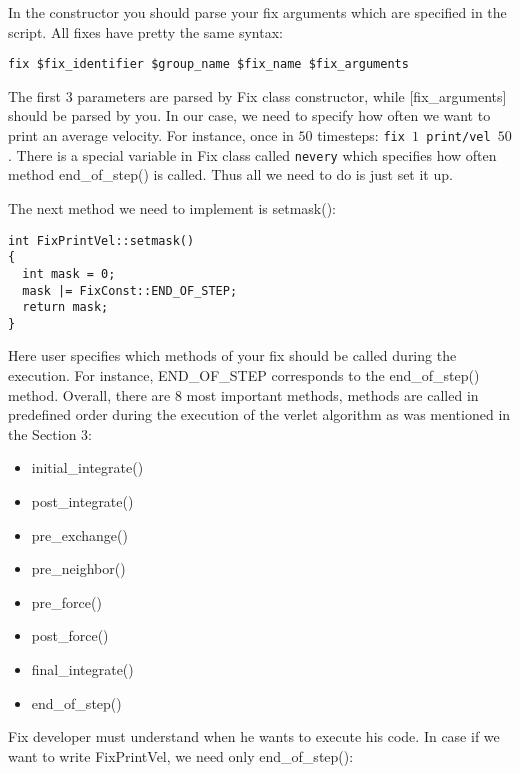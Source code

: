 \documentclass{article}
\newcommand{\code}[1]{{\color{cadetblue}\texttt{#1}}}
\begin{document}
In the constructor you should parse your fix arguments which are
specified in the script. All fixes have pretty the same syntax:

\begin{verbatim}
fix $fix_identifier $group_name $fix_name $fix_arguments
\end{verbatim}

The first $3$ parameters are parsed by Fix class constructor, while
[fix\_arguments] should be parsed by you. In our case, we need to
specify how often we want to print an average velocity. For instance,
once in $50$ timesteps: \code{fix $1$ print/vel $50$}. There is a special variable
in Fix class called \code{nevery} which specifies how often method
end\_of\_step() is called. Thus all we need to do is just set it up.

The next method we need to implement is setmask():
\begin{center}
\begin{verbatim}
int FixPrintVel::setmask()
{
  int mask = 0;
  mask |= FixConst::END_OF_STEP;
  return mask;
}
\end{verbatim}
\end{center}

Here user specifies which methods of your fix should be called during
the execution. For instance, END\_OF\_STEP corresponds to the
end\_of\_step() method. Overall, there are 8 most important methods,
methods are called in predefined order during the execution of the
verlet algorithm as was mentioned in the Section 3:

\begin{itemize}
\item initial\_integrate()
\item post\_integrate()
\item pre\_exchange()
\item pre\_neighbor()
\item pre\_force()
\item post\_force()
\item final\_integrate()
\item end\_of\_step()
\end{itemize}

Fix developer must understand when he wants to execute his code.  In
case if we want to write FixPrintVel, we need only end\_of\_step():
\end{document}
